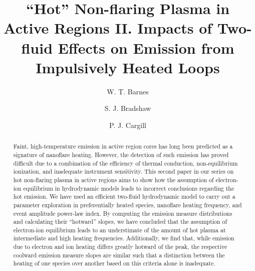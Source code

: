 \documentclass[tighten,apj]{emulateapj}
\begin{document}
	\title{``Hot'' Non-flaring Plasma in Active Regions II. Impacts of Two-fluid Effects on Emission from Impulsively Heated Loops}
	\author{W. T. Barnes}
	\author{S. J. Bradshaw}
	\author{P. J. Cargill}
	\begin{abstract}
		Faint, high-temperature emission in active region cores has long been predicted as a signature of nanoflare heating. However, the detection of such emission has proved difficult due to a combination of the efficiency of thermal conduction, non-equilibrium ionization, and inadequate instrument sensitivity. This second paper in our series on hot non-flaring plasma in active regions aims to show how the assumption of electron-ion equilibrium in hydrodynamic models leads to incorrect conclusions regarding the hot emission. We have used an efficient two-fluid hydrodynamic model to carry out a parameter exploration in preferentially heated species, nanoflare heating frequency, and event amplitude power-law index. By computing the emission measure distributions and calculating their ``hotward'' slopes, we have concluded that the assumption of electron-ion equilibrium leads to an understimate of the amount of hot plasma at intermediate and high heating frequencies. Additionally, we find that, while emission due to electron and ion heating differs greatly hotward of the peak, the respective coolward emission measure slopes are similar such that a distinction between the heating of one species over another based on this criteria alone is inadequate. 
	\end{abstract}
\end{document}
